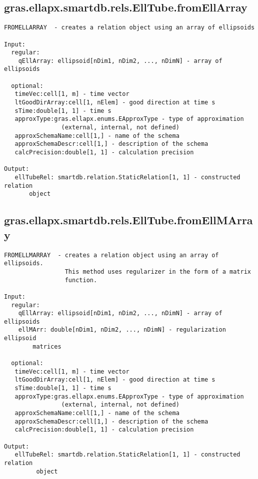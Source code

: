 \subsection{\texorpdfstring{gras.ellapx.smartdb.rels.EllTube.fromEllArray}{fromEllArray}}\label{method:gras.ellapx.smartdb.rels.EllTube.fromEllArray}
\begin{verbatim}
FROMELLARRAY  - creates a relation object using an array of ellipsoids

Input:
  regular:
    qEllArray: ellipsoid[nDim1, nDim2, ..., nDimN] - array of ellipsoids

  optional:
   timeVec:cell[1, m] - time vector
   ltGoodDirArray:cell[1, nElem] - good direction at time s
   sTime:double[1, 1] - time s
   approxType:gras.ellapx.enums.EApproxType - type of approximation
                (external, internal, not defined)
   approxSchemaName:cell[1,] - name of the schema
   approxSchemaDescr:cell[1,] - description of the schema
   calcPrecision:double[1, 1] - calculation precision

Output:
   ellTubeRel: smartdb.relation.StaticRelation[1, 1] - constructed relation
       object
\end{verbatim}
\subsection{\texorpdfstring{gras.ellapx.smartdb.rels.EllTube.fromEllMArray}{fromEllMArray}}\label{method:gras.ellapx.smartdb.rels.EllTube.fromEllMArray}
\begin{verbatim}
FROMELLMARRAY  - creates a relation object using an array of ellipsoids.
                 This method uses regularizer in the form of a matrix
                 function.

Input:
  regular:
    qEllArray: ellipsoid[nDim1, nDim2, ..., nDimN] - array of ellipsoids
    ellMArr: double[nDim1, nDim2, ..., nDimN] - regularization ellipsoid
        matrices

  optional:
   timeVec:cell[1, m] - time vector
   ltGoodDirArray:cell[1, nElem] - good direction at time s
   sTime:double[1, 1] - time s
   approxType:gras.ellapx.enums.EApproxType - type of approximation
                (external, internal, not defined)
   approxSchemaName:cell[1,] - name of the schema
   approxSchemaDescr:cell[1,] - description of the schema
   calcPrecision:double[1, 1] - calculation precision

Output:
   ellTubeRel: smartdb.relation.StaticRelation[1, 1] - constructed relation
         object
\end{verbatim}

